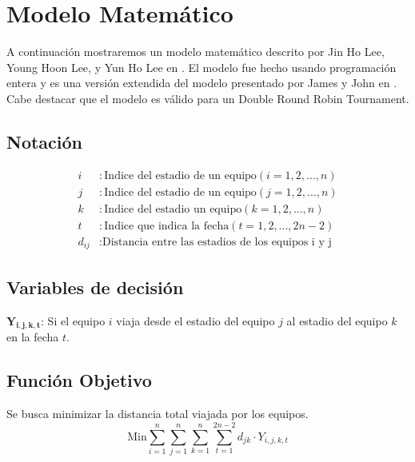 \documentclass[letter, 10pt]{article}
\begin{document}
\section{Modelo Matem\'atico}
     A continuación mostraremos un modelo matemático descrito por Jin Ho Lee, Young Hoon Lee, y Yun Ho Lee en \cite{Modelo}. El modelo fue hecho usando programación entera y es una versión extendida del modelo presentado por James y John en \cite{duenos_modelo}. Cabe destacar que el modelo es válido para un Double Round Robin Tournament.
     
\subsection*{Notación}
\begin{align*}
i&: \text{Indice del estadio de un equipo} (i = 1, 2, ..., n) \\
j&: \text{Indice del estadio de un equipo} (j = 1, 2, ..., n) \\
k&: \text{Indice del estadio un equipo} (k = 1, 2, ..., n) \\
t&: \text{Indice que indica la fecha} (t = 1, 2, ..., 2n-2) \\
d_{ij}&: \text{Distancia entre las estadios de los equipos i y j}
\end{align*}


\subsection*{Variables de decisión}
$\mathbf{Y_{i, j, k, t}}$: Si el equipo $i$ viaja desde el estadio del equipo $j$ al estadio del equipo $k$ en la fecha $t$.

\subsection*{Función Objetivo}
Se busca minimizar la distancia total viajada por los equipos.
\begin{equation}
  \text{Min} \sum_{i=1}^n \sum_{j=1}^n \sum_{k=1}^n \sum_{t=1}^{2n-2} d_{jk} \cdot Y_{i, j, k, t}
\end{equation}
\end{document}
